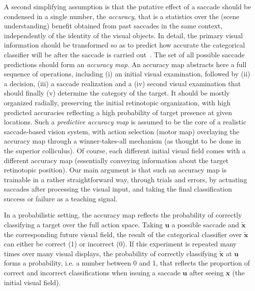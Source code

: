 A second simplifying assumption is that the putative effect of a saccade should be condensed in a single number, the \emph{accuracy}, that is a statistics over the (scene understanding) benefit obtained from past saccades in the same context, independently of the identity of the visual objects. In detail, the primary visual information should be transformed so as to predict how accurate the categorical classifier will be after the saccade is carried out~\citep{Dauce18}. The set of all possible saccade predictions should form an \emph{accuracy map}.
An accuracy map abstracts here a full sequence of operations, including (i) an initial visual examination, followed by (ii) a decision, (iii) a saccade realization and a (iv) second visual examination that should finally (v) determine the category of the target. 
It should be mostly organized radially, preserving the initial retinotopic organization, with high predicted accuracies reflecting a high probability of target presence at given locations. 
Such  a \emph{predictive accuracy map} is assumed to be the core of a realistic saccade-based vision system, with action selection (motor map) overlaying the accuracy map through a winner-takes-all mechanism (as thought to be done in the superior colliculus). Of course, each different initial visual field comes with a different accuracy map (essentially conveying information about the target retinotopic position).
Our main argument is that such an accuracy map is trainable in a rather straightforward way, through trials and errors, by actuating saccades after processing the visual input, and taking the final classification success or failure as a teaching signal. 
\fi

\CNS In a probabilistic setting, the accuracy map reflects the probability of correctly classifying a target over the full action space. Taking $\boldsymbol{u}$ a possible saccade and $\tilde{\boldsymbol{x}}$ the corresponding future visual field, the result of the categorical classifier over $\tilde{\boldsymbol{x}}$ can either be correct (1) or incorrect (0). If this experiment is repeated many times over many visual displays, the probability of correctly classifying $\tilde{\boldsymbol{x}}$ at $\boldsymbol{u}$ forms a probability, i.e. a number between 0 and 1, that reflects the proportion of correct and incorrect classifications when issuing a saccade $\boldsymbol{u}$ after seeing $\boldsymbol{x}$ (the initial visual field). 
\fi

